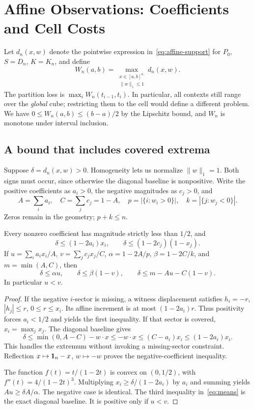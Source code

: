 \section{Affine Observations: Coefficients and Cell Costs}\label{sec:affine}
Let $d_n(x,w)$ denote the pointwise expression in~\eqref{eq:affine-support} for $P_0$, $S=D_n$, $K=K_n$, and define
\begin{equation}\label{eq:affine-cell}
W_n(a,b)=\max_{\substack{x\in[a,b]^n\\\|w\|_1\le1}}d_n(x,w).
\end{equation}
The partition loss is $\max_i W_n(t_{i-1},t_i)$. In particular, all contexts still range over the \emph{global} cube; restricting them to the cell would define a different problem. We have $0\le W_n(a,b)\le(b-a)/2$ by the Lipschitz bound, and $W_n$ is monotone under interval inclusion.

\subsection{A bound that includes covered extrema}
Suppose $\delta=d_n(x,w)>0$. Homogeneity lets us normalize $\|w\|_1=1$. Both signs must occur, since otherwise the diagonal baseline is nonpositive. Write the positive coefficients as $a_i>0$, the negative magnitudes as $c_j>0$, and
\[
A=\sum_i a_i,\quad C=\sum_j c_j=1-A,\quad p=|\{i:w_i>0\}|,\quad k=|\{j:w_j<0\}|.
\]
Zeros remain in the geometry; $p+k\le n$.

\begin{lemma}\label{lem:coefficient}
Every nonzero coefficient has magnitude strictly less than $1/2$, and
\begin{equation}\label{eq:coefficients}
\delta\le(1-2a_i)x_i,\qquad
\delta\le(1-2c_j)(1-x_j).
\end{equation}
If $u=\sum_i a_ix_i/A$, $v=\sum_j c_jx_j/C$, $\alpha=1-2A/p$, $\beta=1-2C/k$, and $m=\min(A,C)$, then
\begin{equation}\label{eq:means}
\delta\le\alpha u,\qquad
\delta\le\beta(1-v),\qquad
\delta\le m-Au-C(1-v).
\end{equation}
In particular $u<v$.
\end{lemma}
\begin{proof}
If the negative $i$-sector is missing, a witness displacement satisfies $h_i=-r$, $|h_j|\le r$, $0\le r\le x_i$. Its affine increment is at most $(1-2a_i)r$. Thus positivity forces $a_i<1/2$ and yields the first inequality. If that sector is covered, $x_i=\max_jx_j$. The diagonal baseline gives
\[
\delta\le\min(0,A-C)-w\cdot x
\le-w\cdot x\le(C-a_i)x_i\le(1-2a_i)x_i.
\]
This handles the extremum without invoking a missing-sector constraint. Reflection $x\mapsto\mathbf 1_n-x$, $w\mapsto-w$ proves the negative-coefficient inequality.

The function $f(t)=t/(1-2t)$ is convex on $(0,1/2)$, with $f''(t)=4/(1-2t)^3$. Multiplying $x_i\ge\delta/(1-2a_i)$ by $a_i$ and summing yields $Au\ge\delta A/\alpha$. The negative case is identical. The third inequality in~\eqref{eq:means} is the exact diagonal baseline. It is positive only if $u<v$.
\end{proof}

